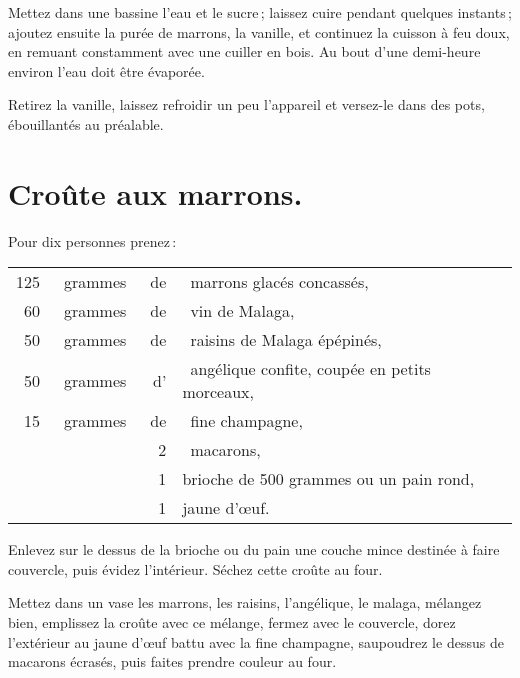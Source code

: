 Mettez dans une bassine l'eau et le sucre ; laissez cuire pendant quelques
instants ; ajoutez ensuite la purée de marrons, la vanille, et continuez la
cuisson à feu doux, en remuant constamment avec une cuiller en bois. Au bout
d'une demi-heure environ l'eau doit être évaporée.

Retirez la vanille, laissez refroidir un peu l'appareil et versez-le dans des pots,
ébouillantés au préalable.

\section*{\centering Croûte aux marrons.}
{}

Pour dix personnes prenez :

\footnotesize
\begin{longtable}{rrrp{16em}}
    125 & grammes & de & marrons glacés concassés,                                                        \\
     60 & grammes & de & vin de Malaga,                                                                   \\
     50 & grammes & de & raisins de Malaga épépinés,                                                      \\
     50 & grammes & d' & angélique confite, coupée en petits morceaux,                                    \\
     15 & grammes & de & fine champagne,                                                                  \\
        &         &  2 & macarons,                                                                        \\
        &         &  1 & brioche de 500 grammes ou un pain rond,                                          \\
        &         &  1 & jaune d'œuf.                                                                     \\
\end{longtable}
\normalsize

Enlevez sur le dessus de la brioche ou du pain une couche mince destinée
à faire couvercle, puis évidez l'intérieur. Séchez cette croûte au four.

Mettez dans un vase les marrons, les raisins, l'angélique, le malaga, mélangez
bien, emplissez la croûte avec ce mélange, fermez avec le couvercle, dorez
l'extérieur au jaune d'œuf battu avec la fine champagne, saupoudrez le dessus
de macarons écrasés, puis faites prendre couleur au four.

